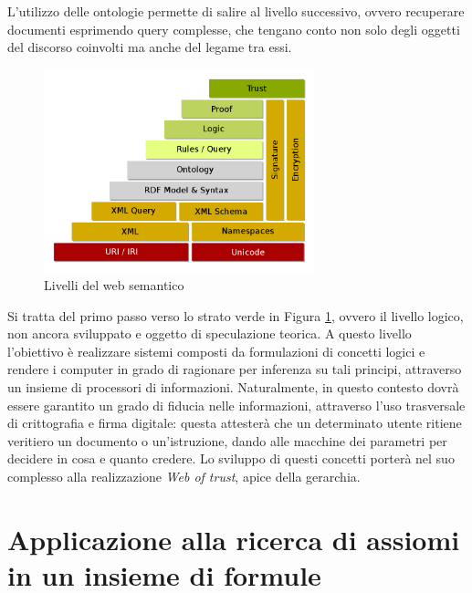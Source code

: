 \documentclass[12pt,a4paper]{report}
\begin{document}
L'utilizzo delle ontologie permette di salire al livello successivo, ovvero recuperare documenti esprimendo query complesse, che tengano conto non solo degli oggetti del discorso coinvolti ma anche del legame tra essi.

\begin{figure}[h]	
\centering
\includegraphics[width=0.7\textwidth]{images/semanticweblayers.png}
\caption{Livelli del web semantico}
\label{livelliWebSemantico}
\end{figure}


Si tratta del primo passo verso lo strato verde in Figura \ref{livelliWebSemantico}, ovvero il livello logico, non ancora sviluppato e oggetto di speculazione teorica. A questo livello l'obiettivo è realizzare sistemi composti da formulazioni di concetti logici e rendere i computer in grado di ragionare per inferenza su tali principi, attraverso un insieme di processori di informazioni. Naturalmente, in questo contesto dovrà essere garantito un grado di fiducia nelle informazioni, attraverso l'uso trasversale di crittografia e firma digitale: questa attesterà che un determinato utente ritiene veritiero un documento o un'istruzione, dando alle macchine dei parametri per 
decidere in cosa e quanto credere.
Lo sviluppo di questi concetti porterà nel suo complesso alla realizzazione \emph{Web of trust}, apice della gerarchia.


\section{Applicazione alla ricerca di assiomi in un insieme di formule}
\end{document}
